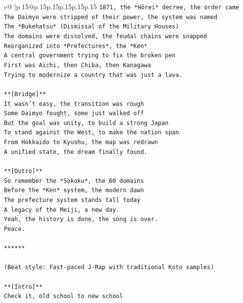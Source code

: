 \documentclass{article}
\begin{document}
{\begin{supertabular}{c@{$\;$}|p{.15\linewidth}@{}p{.15\linewidth}p{.15\linewidth}p{.15\linewidth}p{.15\linewidth}p{.15\linewidth}}
{{{\texttt{1871, the *Hōrei* decree, the order came} \\
\texttt{The Daimyo were stripped of their power, the system was named} \\
\texttt{The *Bukehatsu* (Dismissal of the Military Houses)} \\
\texttt{The domains were dissolved, the feudal chains were snapped} \\
\texttt{Reorganized into *Prefectures*, the *Ken*} \\
\texttt{A central government trying to fix the broken pen} \\
\texttt{First was Aichi, then Chiba, then Kanagawa} \\
\texttt{Trying to modernize a country that was just a lava.} \\
\\ 
\texttt{**{[}Bridge{]}**} \\
\texttt{It wasn't easy, the transition was rough} \\
\texttt{Some Daimyo fought, some just walked off} \\
\texttt{But the goal was unity, to build a strong Japan} \\
\texttt{To stand against the West, to make the nation span} \\
\texttt{From Hokkaido to Kyushu, the map was redrawn} \\
\texttt{A unified state, the dream finally found.} \\
\\ 
\texttt{**{[}Outro{]}**} \\
\texttt{So remember the *Sokoku*, the 60 domains} \\
\texttt{Before the *Ken* system, the modern dawn} \\
\texttt{The prefecture system stands tall today} \\
\texttt{A legacy of the Meiji, a new day.} \\
\texttt{Yeah, the history is done, the song is over.} \\
\texttt{Peace.} \\
\\ 
\texttt{******} \\
\\ 
\texttt{(Beat style: Fast{-}paced J{-}Rap with traditional Koto samples)} \\
\\ 
\texttt{**{[}Intro{]}**} \\
\texttt{Check it, old school to new school} \\
}}}
\end{supertabular}}
\end{document}
